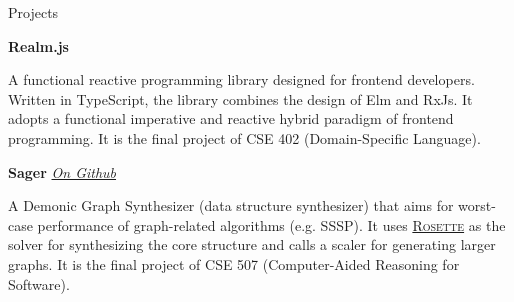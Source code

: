 \documentclass{resume}
\begin{document}
	\begin{rSection}{Projects}
	


		\textbf{Realm.js}
		\vspace{-5pt}

		A functional reactive programming library designed for frontend developers. Written in TypeScript, the library combines the design of Elm and RxJs. It adopts a functional imperative and reactive hybrid paradigm of frontend programming. It is the final project of CSE 402 (Domain-Specific Language).
		\vspace{-5pt}

		\textbf{Sager} \hfill {\em {\href{https://github.com/AD1024/Sager}{On Github}}}
		\vspace{-5pt}

		A Demonic Graph Synthesizer (data structure synthesizer) that aims for worst-case performance of graph-related algorithms (e.g. SSSP). It uses \href{https://github.com/emina/rosette}{\textsc{Rosette}} as the solver for synthesizing the core structure and calls a scaler for generating larger graphs. It is the final project of CSE 507 (Computer-Aided Reasoning for Software).

		



\end{rSection}
\end{document}
